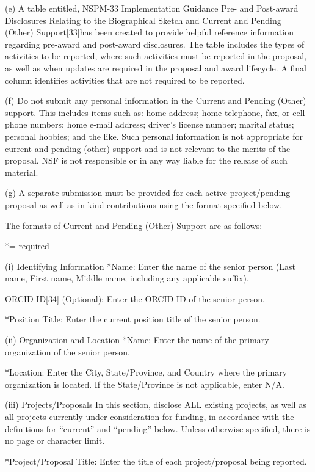 {(e) A table entitled, NSPM-33 Implementation Guidance Pre- and Post-award Disclosures Relating to the Biographical Sketch and Current and Pending (Other) Support[33]has been created to provide helpful reference information regarding pre-award and post-award disclosures. The table includes the types of activities to be reported, where such activities must be reported in the proposal, as well as when updates are required in the proposal and award lifecycle. A final column identifies activities that are not required to be reported.

(f) Do not submit any personal information in the Current and Pending (Other) support. This includes items such as: home address; home telephone, fax, or cell phone numbers; home e-mail address; driver’s license number; marital status; personal hobbies; and the like. Such personal information is not appropriate for current and pending (other) support and is not relevant to the merits of the proposal. NSF is not responsible or in any way liable for the release of such material.

(g) A separate submission must be provided for each active project/pending proposal as well as in-kind contributions using the format specified below.

The formats of Current and Pending (Other) Support are as follows:

*= required

(i) Identifying Information
*Name: Enter the name of the senior person (Last name, First name, Middle name, including any applicable suffix).

ORCID ID[34] (Optional): Enter the ORCID ID of the senior person.

*Position Title: Enter the current position title of the senior person.

(ii) Organization and Location
*Name: Enter the name of the primary organization of the senior person.

*Location: Enter the City, State/Province, and Country where the primary organization is located. If the State/Province is not applicable, enter N/A.

(iii) Projects/Proposals
In this section, disclose ALL existing projects, as well as all projects currently under consideration for funding, in accordance with the definitions for “current” and “pending” below. Unless otherwise specified, there is no page or character limit.

*Project/Proposal Title: Enter the title of each project/proposal being reported.

}
